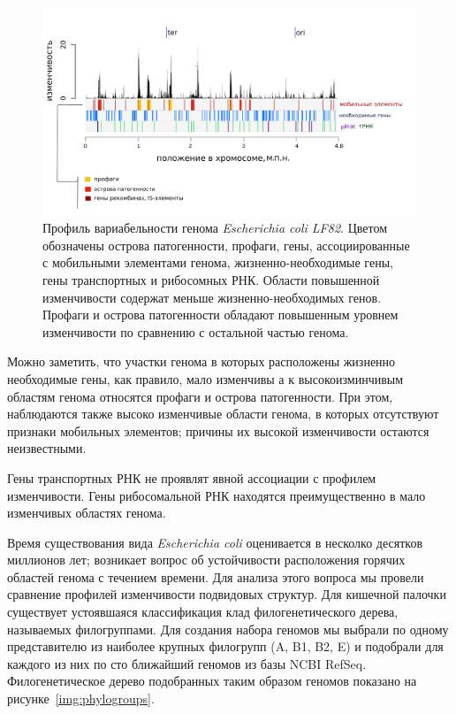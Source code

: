 \begin{figure}[!ht] 
    \center
      \includegraphics[width=\textwidth]{Dissertation/images/complexity/figure5plus.png}
    \caption{Профиль вариабельности генома \textit{Escherichia coli LF82}. Цветом обозначены острова патогенности, профаги,  гены, ассоциированные с мобильными элементами генома, жизненно-необходимые гены, гены транспортных и рибосомных РНК. Области повышенной изменчивости содержат меньше жизненно-необходимых генов. Профаги и острова патогенности обладают повышенным уровнем изменчивости по сравнению с остальной частью генома.}
    \label{img:complexity_lf82} 
  \end{figure}

Можно заметить, что участки генома в которых расположены жизненно необходимые гены, как правило, мало изменчивы а к высокоизминчивым областям генома относятся профаги и острова патогенности. При этом, наблюдаются также высоко изменчивые области генома, в которых отсутствуют признаки мобильных элементов; причины их высокой изменчивости остаются неизвестными. 

Гены транспортных РНК не проявлят явной ассоциации с профилем изменчивости. Гены рибосомальной РНК находятся преимущественно в мало изменчивых областях генома. 

Время существования вида \textit{Escherichia coli} оценивается в несколко десятков миллионов лет; возникает вопрос об устойчивости расположения горячих областей генома с течением времени. Для анализа этого вопроса мы провели сравнение профилей изменчивости подвидовых структур.  Для кишечной палочки существует устоявшаяся классификация клад филогенетического дерева,  называемых филогруппами.  Для создания набора геномов мы выбрали по одному представителю из наиболее крупных филогрупп (A, B1, B2, E) и подобрали для каждого из них  по сто ближайший геномов из базы NCBI RefSeq. Филогенетическое дерево подобранных таким образом геномов показано на рисунке~\ref{img:phylogroups}. 

